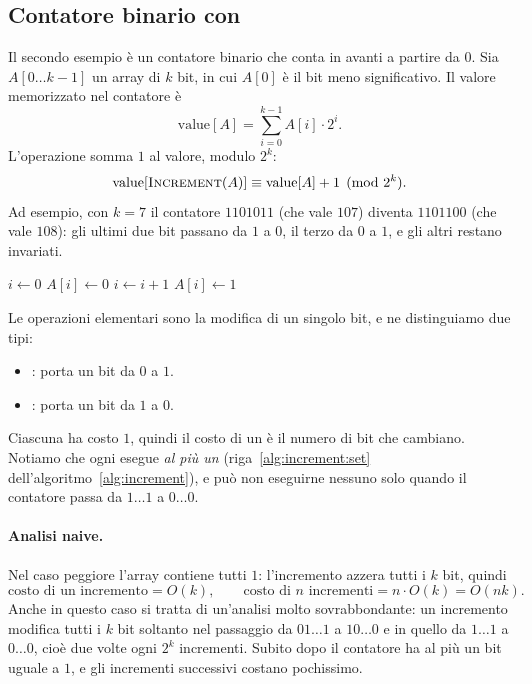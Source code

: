 \subsection{Contatore binario con \Increment}\label{sec:contatore}
Il secondo esempio è un contatore binario che conta in avanti a partire da $0$. Sia $A[0\dots k-1]$ un array di $k$ bit, in cui $A[0]$ è il bit meno significativo. Il valore memorizzato nel contatore è
\[
\mathrm{value}[A] = \sum_{i=0}^{k-1} A[i]\cdot 2^i.
\]
L'operazione \Increment{} somma $1$ al valore, modulo $2^k$:
\[
\mathrm{value}[\textsc{Increment}(A)] \equiv \mathrm{value}[A] + 1 \pmod{2^k}.
\]
Ad esempio, con $k=7$ il contatore $1101011$ (che vale $107$) diventa $1101100$ (che vale $108$): gli ultimi due bit passano da $1$ a $0$, il terzo da $0$ a $1$, e gli altri restano invariati.

\begin{algorithm}[htbp]
\caption{L'operazione $\Increment(A)$ azzera i bit uguali a $1$ a partire dal meno significativo (propagando il riporto) e porta a $1$ il primo bit uguale a $0$ che incontra.}\label{alg:increment}
\begin{algorithmic}[1]
  \State $i \gets 0$
    \State $A[i] \gets 0$
    \State $i \gets i+1$
  \EndWhile
    \State $A[i] \gets 1$\label{alg:increment:set}
  \EndIf
\EndProcedure
\end{algorithmic}
\end{algorithm}

\noindent
Le operazioni elementari sono la modifica di un singolo bit, e ne distinguiamo due tipi:
\begin{itemize}
    \item \textbf{\SetBit}: porta un bit da $0$ a $1$.
    \item \textbf{\ResetBit}: porta un bit da $1$ a $0$.
\end{itemize}
Ciascuna ha costo $1$, quindi il costo di un \Increment{} è il numero di bit che cambiano. Notiamo che ogni \Increment{} esegue \emph{al più un} \SetBit{} (riga~\ref{alg:increment:set} dell'algoritmo~\ref{alg:increment}), e può non eseguirne nessuno solo quando il contatore passa da $1\dots1$ a $0\dots0$.

\paragraph{Analisi naive.}
Nel caso peggiore l'array contiene tutti $1$: l'incremento azzera tutti i $k$ bit, quindi
\[
\text{costo di un incremento} = O(k), \qquad \text{costo di } n \text{ incrementi} = n \cdot O(k) = O(nk).
\]
Anche in questo caso si tratta di un'analisi molto sovrabbondante: un incremento modifica tutti i $k$ bit soltanto nel passaggio da $01\dots1$ a $10\dots0$ e in quello da $1\dots1$ a $0\dots0$, cioè due volte ogni $2^k$ incrementi. Subito dopo il contatore ha al più un bit uguale a $1$, e gli incrementi successivi costano pochissimo.

